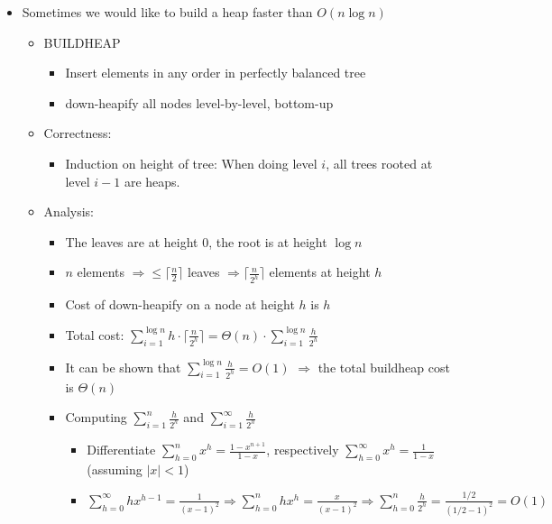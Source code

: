 \documentclass[11pt]{article}
\begin{document}
\begin{itemize}
\item Sometimes we would like to build a heap faster than $O(n\log n)$
\begin{itemize}
\item BUILDHEAP
  \begin{itemize}
  \item Insert elements in any order in perfectly balanced tree
  \item {\sc down-heapify} all nodes level-by-level, bottom-up
  \end{itemize}
  
\item Correctness: 
  \begin{itemize}
  \item Induction on height of tree: When doing level $i$, all trees
    rooted at level $i-1$ are heaps.
  \end{itemize}
  
\item Analysis:
  \begin{itemize}
  \item  The leaves are at height $0$, the root is at height $\log n$
  \item $n$ elements $\Rightarrow \leq \lceil \frac{n}{2}\rceil$
    leaves $\Rightarrow \lceil \frac{n}{2^h}\rceil$ elements at height 
    $h$
  \item Cost of {\sc down-heapify} on a node at height $h$ is $h$
  \item Total cost: $\sum_{i=1}^{\log n} h\cdot \lceil
    \frac{n}{2^h}\rceil=\Theta(n)\cdot \sum_{i=1}^{\log n}
    \frac{h}{2^h}$
  \item It can be shown that $\sum_{i=1}^{\log n} \frac{h}{2^h}=O(1)$
    $\Longrightarrow$ the total buildheap cost is $\Theta(n)$

    \vspace{\baselineskip}
  \item Computing $\sum_{i=1}^{n} \frac{h}{2^h}$ and
  $\sum_{i=1}^{\infty} \frac{h}{2^h}$
    \begin{itemize}
    \item Differentiate $\sum_{h=0}^{n} x^h = \frac{1 -
      x^{n+1}}{1-x}$, respectively $\sum_{h=0}^{\infty} x^h =
      \frac{1}{1-x}$ (assuming $|x|<1$)
    \item $\sum_{h=0}^{\infty} hx^{h-1}=\frac{1}{(x-1)^2} \Rightarrow
      \sum_{h=0}^{n} hx^h=\frac{x}{(x-1)^2} \Rightarrow \sum_{h=0}^{n}
      \frac{h}{2^h}=\frac{1/2}{(1/2-1)^2}=O(1)$
    \end{itemize}
  \end{itemize}
\end{itemize}

\end{itemize}
\end{document}
